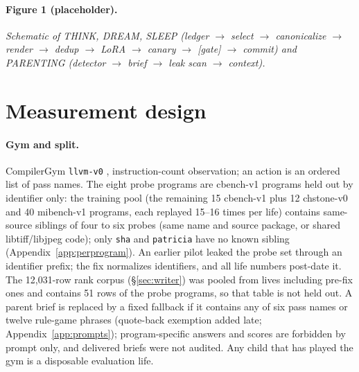 \documentclass{article}
\begin{document}
\paragraph{Figure 1 (placeholder).} \emph{Schematic of THINK, DREAM, SLEEP (ledger $\to$ select $\to$ canonicalize $\to$ render $\to$ dedup $\to$ LoRA $\to$ canary $\to$ [gate] $\to$ commit) and PARENTING (detector $\to$ brief $\to$ leak scan $\to$ context).}

\section{Measurement design}
\label{sec:measure}

\paragraph{Gym and split.} CompilerGym \texttt{llvm-v0} \citep{cummins2021compilergym}, instruction-count observation; an action is an ordered list of pass names. The eight probe programs are cbench-v1 programs held out by identifier only: the training pool (the remaining 15 cbench-v1 plus 12 chstone-v0 and 40 mibench-v1 programs, each replayed 15--16 times per life) contains same-source siblings of four to six probes (same name and source package, or shared libtiff/libjpeg code); only \texttt{sha} and \texttt{patricia} have no known sibling (Appendix~\ref{app:perprogram}). An earlier pilot leaked the probe set through an identifier prefix; the fix normalizes identifiers, and all life numbers post-date it. The 12{,}031-row rank corpus (\S\ref{sec:writer}) was pooled from lives including pre-fix ones and contains 51 rows of the probe programs, so that table is not held out. A parent brief is replaced by a fixed fallback if it contains any of six pass names or twelve rule-game phrases (quote-back exemption added late; Appendix~\ref{app:prompts}); program-specific answers and scores are forbidden by prompt only, and delivered briefs were not audited. Any child that has played the gym is a disposable evaluation life.
\end{document}
